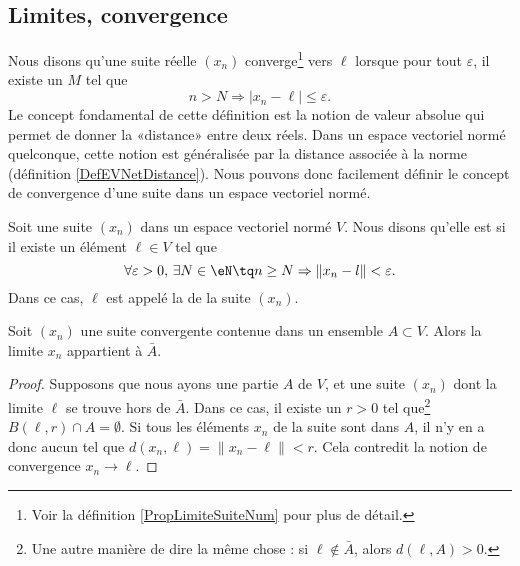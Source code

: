 \subsection{Limites, convergence}

Nous disons qu'une suite réelle $(x_n)$ converge\footnote{Voir la définition \ref{PropLimiteSuiteNum} pour plus de détail.} vers $\ell$ lorsque pour tout $\varepsilon$, il existe un $M$ tel que
\begin{equation}
	n>N\Rightarrow | x_n-\ell |\leq\varepsilon.
\end{equation}
Le concept fondamental de cette définition est la notion de valeur absolue qui permet de donner la «distance» entre deux réels. Dans un espace vectoriel normé quelconque, cette notion est généralisée par la distance associée à la norme (définition \ref{DefEVNetDistance}). Nous pouvons donc facilement définir le concept de convergence d'une suite dans un espace vectoriel normé.

\begin{definition}		\label{DefCvSuiteEGVN}
	Soit une suite $(x_n)$ dans un espace vectoriel normé $V$. Nous disons qu'elle est  si il existe un élément $\ell\in V$ tel que
	\begin{equation}
		\forall \varepsilon>0,\,\exists N\in\eN\tq n\geq N\Rightarrow \| x_n-l \|<\varepsilon.
	\end{equation}
	Dans ce cas, $\ell$ est appelé la  de la suite $(x_n)$.
\end{definition}


\begin{lemma}		\label{LemLimAbarA}
	Soit $(x_n)$ une suite convergente contenue dans un ensemble $A\subset V$. Alors la limite $x_n$ appartient à $\bar A$.
\end{lemma}

\begin{proof}
	Supposons que nous ayons une partie $A$ de $V$, et une suite $(x_n)$ dont la limite $\ell$ se trouve hors de $\bar A$. Dans ce cas, il existe un $r>0$ tel que\footnote{Une autre manière de dire la même chose : si $\ell\notin\bar A$, alors $d(\ell,A)>0$.} $B(\ell,r)\cap A=\emptyset$. Si tous les éléments $x_n$ de la suite sont dans $A$, il n'y en a donc aucun tel que $d(x_n,\ell)=\| x_n-\ell \|<r$. Cela contredit la notion de convergence $x_n\to \ell$.
\end{proof}

